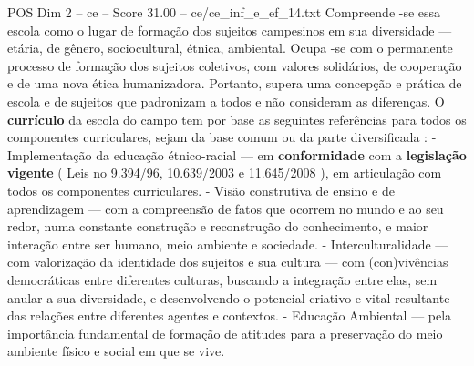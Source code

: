 \begin{textsample}{POS Dim 2 – ce – Score 31.00 – ce/ce\_inf\_e\_ef\_14.txt}
Compreende -se essa escola como o lugar de formação dos sujeitos campesinos em sua diversidade — etária, de gênero, sociocultural, étnica, ambiental.
Ocupa -se com o permanente processo de formação dos sujeitos coletivos, com valores solidários, de cooperação e de uma nova ética humanizadora.
Portanto, supera uma concepção e prática de escola e de sujeitos que padronizam a todos e não consideram as diferenças.
O \textbf{currículo} da escola do campo tem por base as seguintes referências para todos os componentes curriculares, sejam da base comum ou da parte diversificada : - Implementação da educação étnico-racial — em \textbf{conformidade} com a \textbf{legislação} \textbf{vigente} ( Leis no 9.394/96, 10.639/2003 e 11.645/2008 ), em articulação com todos os componentes curriculares. - Visão construtiva de ensino e de aprendizagem — com a compreensão de fatos que ocorrem no mundo e ao seu redor, numa constante construção e reconstrução do conhecimento, e maior interação entre ser humano, meio ambiente e sociedade. - Interculturalidade — com valorização da identidade dos sujeitos e sua cultura — com (con)vivências democráticas entre diferentes culturas, buscando a integração entre elas, sem anular a sua diversidade, e desenvolvendo o potencial criativo e vital resultante das relações entre diferentes agentes e contextos. - Educação Ambiental — pela importância fundamental de formação de atitudes para a preservação do meio ambiente físico e social em que se vive.

\end{textsample}
